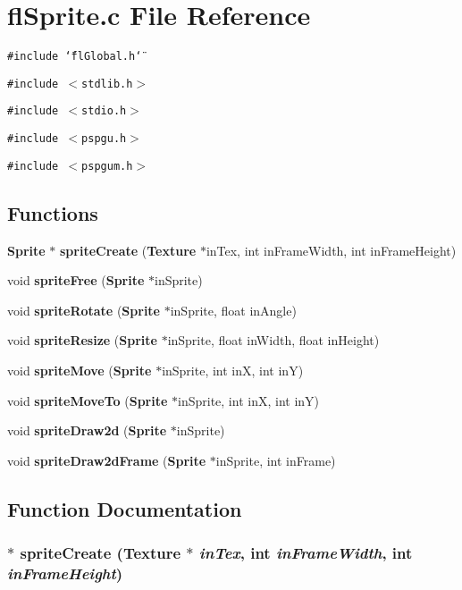 \section{fl\-Sprite.c File Reference}
\label{flSprite_8c}
{\tt \#include \char`\"{}fl\-Global.h\char`\"{}}\par
{\tt \#include $<$stdlib.h$>$}\par
{\tt \#include $<$stdio.h$>$}\par
{\tt \#include $<$pspgu.h$>$}\par
{\tt \#include $<$pspgum.h$>$}\par
\subsection*{Functions}
\begin{CompactItemize}
\item 
{\bf Sprite} $\ast$ {\bf sprite\-Create} ({\bf Texture} $\ast$in\-Tex, int in\-Frame\-Width, int in\-Frame\-Height)
\item 
void {\bf sprite\-Free} ({\bf Sprite} $\ast$in\-Sprite)
\item 
void {\bf sprite\-Rotate} ({\bf Sprite} $\ast$in\-Sprite, float in\-Angle)
\item 
void {\bf sprite\-Resize} ({\bf Sprite} $\ast$in\-Sprite, float in\-Width, float in\-Height)
\item 
void {\bf sprite\-Move} ({\bf Sprite} $\ast$in\-Sprite, int in\-X, int in\-Y)
\item 
void {\bf sprite\-Move\-To} ({\bf Sprite} $\ast$in\-Sprite, int in\-X, int in\-Y)
\item 
void {\bf sprite\-Draw2d} ({\bf Sprite} $\ast$in\-Sprite)
\item 
void {\bf sprite\-Draw2d\-Frame} ({\bf Sprite} $\ast$in\-Sprite, int in\-Frame)
\end{CompactItemize}


\subsection{Function Documentation}
\subsubsection{$\ast$ sprite\-Create ({\bf Texture} $\ast$ {\em in\-Tex}, int {\em in\-Frame\-Width}, int {\em in\-Frame\-Height})}\label{flSprite_8c_75ec4b4209f048cbad04c4f882851961}




